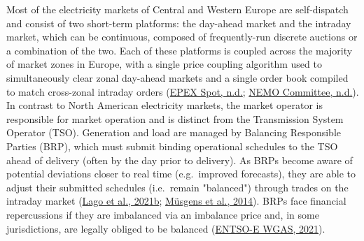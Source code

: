 \documentclass[12pt,a4paper,]{report}
\begin{document}
Most of the electricity markets of Central and Western Europe are
self-dispatch and consist of two short-term platforms: the day-ahead
market and the intraday market, which can be continuous, composed of
frequently-run discrete auctions or a combination of the two. Each of
these platforms is coupled across the majority of market zones in
Europe, with a single price coupling algorithm used to simultaneously
clear zonal day-ahead markets and a single order book compiled to match
cross-zonal intraday orders
(\protect\hyperlink{ref-epexspotEuropeanMarketCoupling}{EPEX Spot,
n.d.}; \protect\hyperlink{ref-nemocommitteeSingleIntradayCoupling}{NEMO
Committee, n.d.}). In contrast to North American electricity markets,
the market operator is responsible for market operation and is distinct
from the Transmission System Operator (TSO). Generation and load are
managed by Balancing Responsible Parties (BRP), which must submit
binding operational schedules to the TSO ahead of delivery (often by the
day prior to delivery). As BRPs become aware of potential deviations
closer to real time (e.g.~improved forecasts), they are able to adjust
their submitted schedules (i.e.~remain "balanced") through trades on the
intraday market
(\protect\hyperlink{ref-lagoMarketFrameworkGrid2021}{Lago et al.,
2021b};
\protect\hyperlink{ref-musgensEconomicsDesignBalancing2014}{Müsgens et
al., 2014}). BRPs face financial repercussions if they are imbalanced
via an imbalance price and, in some jurisdictions, are legally obliged
to be balanced
(\protect\hyperlink{ref-entso-ewgasSurveyAncillaryServices2021}{ENTSO-E
WGAS, 2021}).
\end{document}
